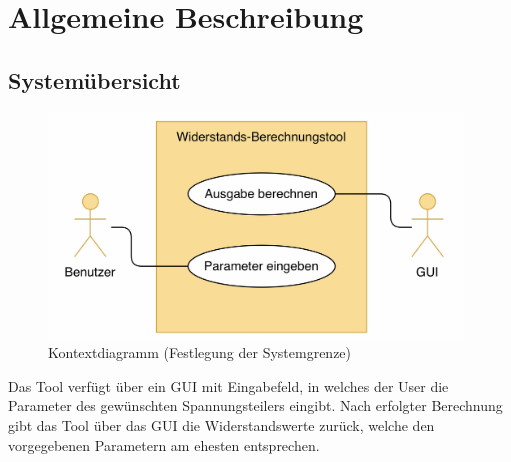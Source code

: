 \section{Allgemeine Beschreibung}
\label{sec:generalProvision}


\subsection{Systemübersicht}
\begin{figure}[!h]
	\centering
	\includegraphics[width=11cm]{./images/Use-Case.jpg}
	\caption{Kontextdiagramm (Festlegung der Systemgrenze)}
	\label{fig:contextDiagram}
\end{figure}
Das Tool verfügt über ein GUI mit Eingabefeld, in welches der User die Parameter des gewünschten Spannungsteilers eingibt. Nach erfolgter Berechnung gibt das Tool über das GUI die Widerstandswerte zurück, welche den vorgegebenen Parametern am ehesten entsprechen.




